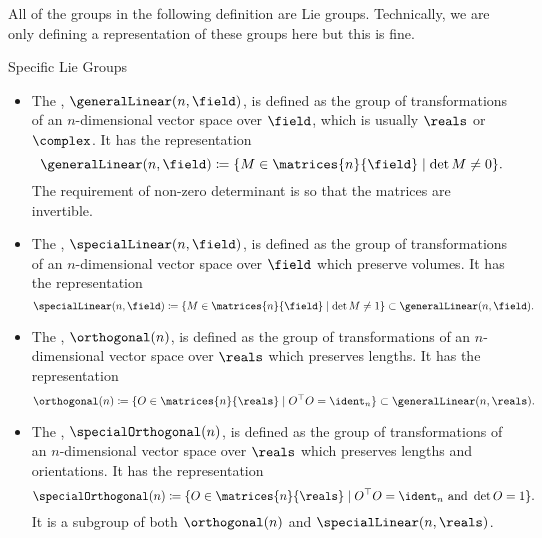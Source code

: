 All of the groups in the following definition are Lie groups.
Technically, we are only defining a representation of these groups here but this is fine.

\begin{dfn}{Specific Lie Groups}{}
    \begin{itemize}
        \item The , \(\generalLinear(n, \field)\), is defined as the group of transformations of an \(n\)-dimensional vector space over \(\field\), which is usually \(\reals\) or \(\complex\).
        It has the representation
        \begin{equation}
            \generalLinear(n, \field) \coloneqq \{M \in \matrices{n}{\field} \mid \det M \ne 0\}.
        \end{equation}
        The requirement of non-zero determinant is so that the matrices are invertible.
        
        \item The , \(\specialLinear(n, \field)\), is defined as the group of transformations of an \(n\)-dimensional vector space over \(\field\) which preserve volumes.
        It has the representation
        \begin{equation}
            \specialLinear(n, \field) \coloneqq \{M \in \matrices{n}{\field} \mid \det M \ne 1\} \subgroup \generalLinear(n, \field).
        \end{equation}
        
        \item The , \(\orthogonal(n)\), is defined as the group of transformations of an \(n\)-dimensional vector space over \(\reals\) which preserves lengths.
        It has the representation
        \begin{equation}
            \orthogonal(n) \coloneqq \{O \in \matrices{n}{\reals} \mid O^\trans O = \ident_n\} \subgroup \generalLinear(n, \reals).
        \end{equation}
        
        \item The , \(\specialOrthogonal(n)\), is defined as the group of transformations of an \(n\)-dimensional vector space over \(\reals\) which preserves lengths and orientations.
        It has the representation
        \begin{equation}
            \specialOrthogonal(n) \coloneqq \{O \in \matrices{n}{\reals} \mid O^\trans O = \ident_n \text{ and } \det O = 1\}.
        \end{equation}
        It is a subgroup of both \(\orthogonal(n)\) and \(\specialLinear(n, \reals)\).
        

\end{itemize}
\end{dfn}
